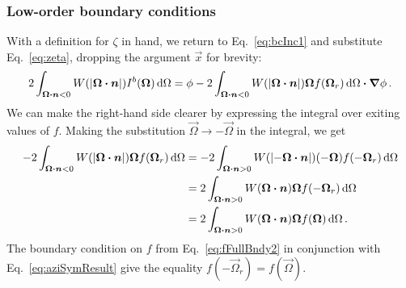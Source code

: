 \subsubsection{Low-order boundary conditions}
With a definition for $\zeta$ in hand, we return to Eq.~\eqref{eq:bcInc1} and
substitute Eq.~\eqref{eq:zeta}, dropping the argument $\vec{x}$ for brevity:
\begin{equation*}
  2\int_{\bm{\Omega}\bm{\cdot} \bm{n} < 0}
  W(\left| \bm{\Omega} \bm{\cdot} \bm{n} \right|) I^b(\bm{\Omega}) \mathop{}\!\mathrm{d}\Omega
  = \phi
  - 2\int_{\bm{\Omega}\bm{\cdot} \bm{n} < 0} W(\left| \bm{\Omega} \bm{\cdot} \bm{n} \right|)
  \bm{\Omega} f(\bm{\Omega}_r) \mathop{}\!\mathrm{d}\Omega
  \bm{\cdot} \bm{\nabla} \phi \,.
\end{equation*}
We can make the right-hand side clearer by expressing the integral over exiting
values of $f$. Making the substitution $\vec{\Omega}\to-\vec{\Omega}$ in the
integral, we get
\begin{align*}
  - 2\int_{\bm{\Omega}\bm{\cdot} \bm{n} < 0} W(\left| \bm{\Omega} \bm{\cdot} \bm{n} \right|)
  \bm{\Omega} f(\bm{\Omega}_r) \mathop{}\!\mathrm{d}\Omega
  &= 
  - 2\int_{\bm{\Omega}\bm{\cdot} \bm{n} > 0} W(\left| -\bm{\Omega} \bm{\cdot} \bm{n} \right|)
  ( - \bm{\Omega}) f(-\bm{\Omega}_r) \mathop{}\!\mathrm{d}\Omega
  \\
  &= 
  2\int_{\bm{\Omega}\bm{\cdot} \bm{n} > 0} W(\bm{\Omega} \bm{\cdot} \bm{n})
  \bm{\Omega} f(-\bm{\Omega}_r) \mathop{}\!\mathrm{d}\Omega
  \\ 
  &= 
  2\int_{\bm{\Omega}\bm{\cdot} \bm{n} > 0} W(\bm{\Omega} \bm{\cdot} \bm{n})
  \bm{\Omega} f(\bm{\Omega}) \mathop{}\!\mathrm{d}\Omega \,.
\end{align*}
The boundary condition on $f$ from Eq.~\eqref{eq:fFullBndy2} in conjunction
with Eq.~\eqref{eq:aziSymResult} give the equality $f(-\vec{\Omega}_r) =
f(\vec{\Omega})$.

